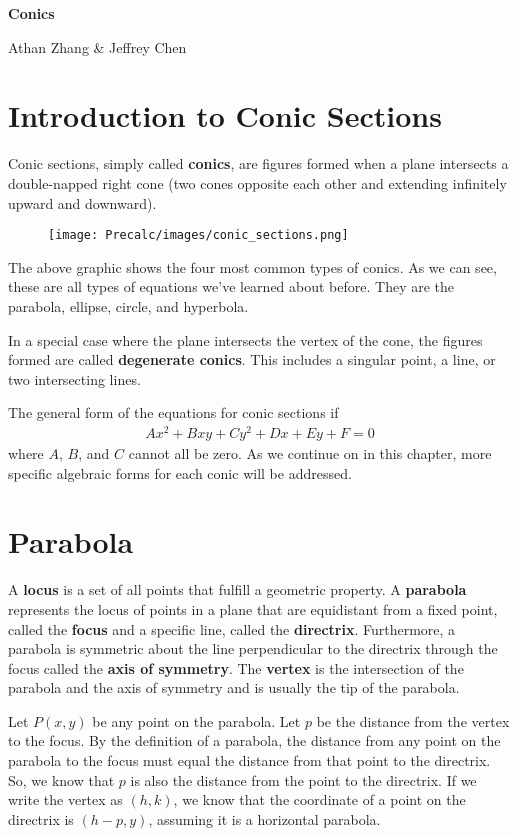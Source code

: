 \documentclass[11pt]{article}
\begin{document}
\textbf{\Huge Conics}

Athan Zhang \& Jeffrey Chen

\section{Introduction to Conic Sections}

Conic sections, simply called \textbf{conics}, are figures formed when a plane intersects a double-napped right cone (two cones opposite each other and extending infinitely upward and downward). 

\begin{figure}[H]
    \centering
    \texttt{[image: Precalc/images/conic\_sections.png]}
\end{figure}

The above graphic shows the four most common types of conics. As we can see, these are all types of equations we've learned about before. They are the parabola, ellipse, circle, and hyperbola.

In a special case where the plane intersects the vertex of the cone, the figures formed are called \textbf{degenerate conics}. This includes a singular point, a line, or two intersecting lines.

The general form of the equations for conic sections if
\begin{align*}
    Ax^2 + Bxy + Cy^2 + Dx + Ey + F = 0
\end{align*}
where $A$, $B$, and $C$ cannot all be zero. As we continue on in this chapter, more specific algebraic forms for each conic will be addressed.

\section{Parabola}

A \textbf{locus} is a set of all points that fulfill a geometric property. A \textbf{parabola} represents the locus of points in a plane that are equidistant from a fixed point, called the \textbf{focus} and a specific line, called the \textbf{directrix}. Furthermore, a parabola is symmetric about the line perpendicular to the directrix through the focus called the \textbf{axis of symmetry}. The \textbf{vertex} is the intersection of the parabola and the axis of symmetry and is usually the tip of the parabola.

Let $P(x,y)$ be any point on the parabola. Let $p$ be the distance from the vertex to the focus. By the definition of a parabola, the distance from any point on the parabola to the focus must equal the distance from that point to the directrix. So, we know that $p$ is also the distance from the point to the directrix. If we write the vertex as $(h, k)$, we know that the coordinate of a point on the directrix is $(h - p, y)$, assuming it is a horizontal parabola.
\end{document}
